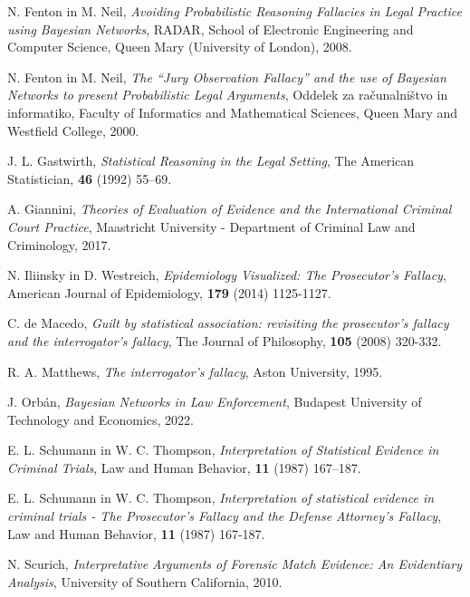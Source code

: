 \documentclass[fin1, tisk]{fmfdelo}
\theoremstyle{definition} %
\theoremstyle{trditev} %
\theoremstyle{izrek}
\begin{document}
\begin{thebibliography}{99}
        N. Fenton in M. Neil, \emph{Avoiding Probabilistic Reasoning Fallacies in Legal Practice using Bayesian Networks}, RADAR, School of Electronic Engineering and Computer Science, Queen Mary (University of London), 2008.

        N. Fenton in M. Neil, \emph{The “Jury Observation Fallacy” and the use of Bayesian Networks to present Probabilistic Legal Arguments}, Oddelek za računalništvo in informatiko, Faculty of Informatics and Mathematical Sciences, Queen Mary and Westfield College, 2000.

        J. L. Gastwirth, \emph{Statistical Reasoning in the Legal Setting}, The American Statistician, \textbf{46} (1992) 55–69.

        A. Giannini, \emph{Theories of Evaluation of Evidence and the International Criminal Court Practice}, Maastricht University - Department of Criminal Law and Criminology, 2017.

        N. Iliinsky in D. Westreich, \emph{Epidemiology Visualized: The Prosecutor’s Fallacy}, American Journal of Epidemiology, \textbf{179} (2014) 1125-1127.

        C. de Macedo, \emph{Guilt by statistical association: revisiting the prosecutor’s fallacy and the interrogator’s fallacy}, The Journal of Philosophy, \textbf{105} (2008) 320-332.

        R. A. Matthews, \emph{The interrogator’s fallacy}, Aston University, 1995.

        J. Orbán, \emph{Bayesian Networks in Law Enforcement}, Budapest University of Technology and Economics, 2022.

        E. L. Schumann in W. C. Thompson, \emph{Interpretation of Statistical Evidence in Criminal Trials}, Law and Human Behavior, \textbf{11} (1987) 167–187.

        E. L. Schumann in W. C. Thompson, \emph{Interpretation of statistical evidence in criminal trials - The Prosecutor's Fallacy and the Defense Attorney's Fallacy}, Law and Human Behavior, \textbf{11} (1987) 167-187.

        N. Scurich, \emph{Interpretative Arguments of Forensic Match Evidence: An Evidentiary Analysis}, University of Southern California, 2010.


\end{thebibliography}
\end{document}
